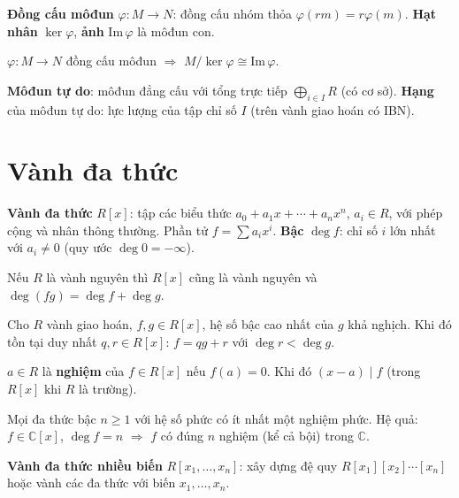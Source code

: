 \documentclass[12pt,a4paper]{article}
\begin{document}
\begin{dinhnghia}
  \textbf{Đồng cấu môđun} $\varphi: M \to N$: đồng cấu nhóm thỏa $\varphi(rm) = r\varphi(m)$. \textbf{Hạt nhân} $\ker \varphi$, \textbf{ảnh} $\mathrm{Im}\,\varphi$ là môđun con.
\end{dinhnghia}

\begin{dinhly}[title={Định lý đồng cấu môđun}]
  $\varphi: M \to N$ đồng cấu môđun $\Rightarrow$ $M/\ker \varphi \cong \mathrm{Im}\,\varphi$.
\end{dinhly}

\begin{dinhnghia}
  \textbf{Môđun tự do}: môđun đẳng cấu với tổng trực tiếp $\bigoplus_{i \in I} R$ (có cơ sở). \textbf{Hạng} của môđun tự do: lực lượng của tập chỉ số $I$ (trên vành giao hoán có IBN).
\end{dinhnghia}

\section{Vành đa thức}

\begin{dinhnghia}
  \textbf{Vành đa thức} $R[x]$: tập các biểu thức $a_0 + a_1 x + \cdots + a_n x^n$, $a_i \in R$, với phép cộng và nhân thông thường. Phần tử $f = \sum a_i x^i$. \textbf{Bậc} $\deg f$: chỉ số $i$ lớn nhất với $a_i \ne 0$ (quy ước $\deg 0 = -\infty$).
\end{dinhnghia}

\begin{dinhly}
  Nếu $R$ là vành nguyên thì $R[x]$ cũng là vành nguyên và $\deg(fg) = \deg f + \deg g$.
\end{dinhly}

\begin{dinhly}[title={Thuật toán chia}]
  Cho $R$ vành giao hoán, $f, g \in R[x]$, hệ số bậc cao nhất của $g$ khả nghịch. Khi đó tồn tại duy nhất $q, r \in R[x]$: $f = qg + r$ với $\deg r < \deg g$.
\end{dinhly}

\begin{dinhnghia}
  $a \in R$ là \textbf{nghiệm} của $f \in R[x]$ nếu $f(a) = 0$. Khi đó $(x - a) \mid f$ (trong $R[x]$ khi $R$ là trường).
\end{dinhnghia}

\begin{dinhly}[title={Định lý cơ bản của đại số}]
  Mọi đa thức bậc $n \ge 1$ với hệ số phức có ít nhất một nghiệm phức. Hệ quả: $f \in \mathbb{C}[x]$, $\deg f = n$ $\Rightarrow$ $f$ có đúng $n$ nghiệm (kể cả bội) trong $\mathbb{C}$.
\end{dinhly}

\begin{dinhnghia}
  \textbf{Vành đa thức nhiều biến} $R[x_1, \ldots, x_n]$: xây dựng đệ quy $R[x_1][x_2]\cdots[x_n]$ hoặc vành các đa thức với biến $x_1, \ldots, x_n$.
\end{dinhnghia}
\end{document}
